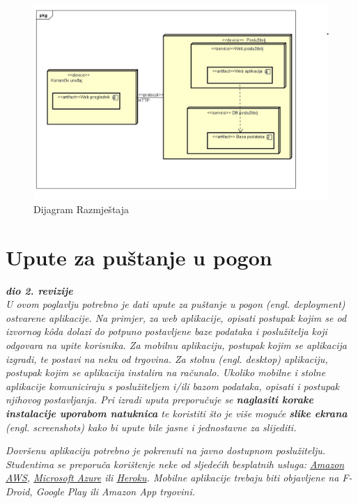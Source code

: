 			 \begin{figure}[H]
			 	\includegraphics[scale=0.4]{slike/dijagramRaz.jpeg} %
			 	\centering
			 	\caption{Dijagram Razmještaja}
			 	\label{fig:DijRazm}
			 \end{figure}
			
			\eject 
		
		\section{Upute za puštanje u pogon}
		
			\textbf{\textit{dio 2. revizije}}\\
		
			 \textit{U ovom poglavlju potrebno je dati upute za puštanje u pogon (engl. deployment) ostvarene aplikacije. Na primjer, za web aplikacije, opisati postupak kojim se od izvornog kôda dolazi do potpuno postavljene baze podataka i poslužitelja koji odgovara na upite korisnika. Za mobilnu aplikaciju, postupak kojim se aplikacija izgradi, te postavi na neku od trgovina. Za stolnu (engl. desktop) aplikaciju, postupak kojim se aplikacija instalira na računalo. Ukoliko mobilne i stolne aplikacije komuniciraju s poslužiteljem i/ili bazom podataka, opisati i postupak njihovog postavljanja. Pri izradi uputa preporučuje se \textbf{naglasiti korake instalacije uporabom natuknica} te koristiti što je više moguće \textbf{slike ekrana} (engl. screenshots) kako bi upute bile jasne i jednostavne za slijediti.}
			
			
			 \textit{Dovršenu aplikaciju potrebno je pokrenuti na javno dostupnom poslužitelju. Studentima se preporuča korištenje neke od sljedećih besplatnih usluga: \href{https://aws.amazon.com/}{Amazon AWS}, \href{https://azure.microsoft.com/en-us/}{Microsoft Azure} ili \href{https://www.heroku.com/}{Heroku}. Mobilne aplikacije trebaju biti objavljene na F-Droid, Google Play ili Amazon App trgovini.}
			
			
			\eject 